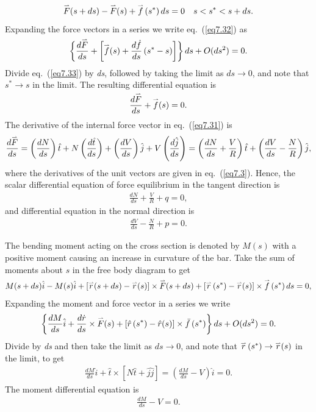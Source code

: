 \documentclass{AeroStructure-ERJohnson}
\def\harp#1{\smash{\mathord{\buildrel{\lower3pt\hbox{$\scriptscriptstyle\rightharpoonup$}}\over{#1}}}}
\begin{document}
\begin{align}\label{eq7.32}
\harp{F}(s+d s)-\harp{F}(s)+\harp{f}\left(s^{*}\right) d s=0 \quad s<s^{*}<s+d s.
\end{align}
Expanding the force vectors in a series we write eq.~(\ref{eq7.32}) as
\begin{align}\label{eq7.33}
\left\{\frac{d \harp{F}}{d s}+\left[\harp{f}(s)+\frac{d \dot{f}}{d s}\left(s^{*}-s\right)\right]\right\} d s+O(d s^{2})=0.
\end{align}
Divide eq.~(\ref{eq7.33}) by \textit{ds}, followed by taking the limit as $d s \rightarrow 0$, and note that $s^{*} \rightarrow s$ in the limit. The resulting differential equation is
\begin{align}\label{eq7.34}
\frac{d \harp{F}}{d s}+\harp{f}(s)=0.
\end{align}
The derivative of the internal force vector in eq.~(\ref{eq7.31}) is
\begin{equation*}
\frac{d \harp{F}}{d s}=\left(\frac{d N}{d s}\right) \hat{t}+N\left(\frac{d \hat{t}}{d s}\right)+\left(\frac{d V}{d s}\right) \hat{j}+V\left(\frac{d \hat{j}}{d s}\right)=\left(\frac{d N}{d s}+\frac{V}{R}\right) \hat{t}+\left(\frac{d V}{d s}-\frac{N}{R}\right) \hat{j},
\end{equation*}
where the derivatives of the unit vectors are given in eq.~(\ref{eq7.3}). Hence, the scalar differential equation of force equilibrium in the tangent direction is
\begin{align}\label{eq7.35}
\frac{d N}{d s}+\frac{V}{R}+q=0,
\end{align}
and differential equation in the normal direction is
\begin{align}\label{eq7.36}
\frac{d V}{d s}-\frac{N}{R}+p=0.
\end{align}

The bending moment acting on the cross section is denoted by $M(s)$ with a positive moment causing an increase in curvature of the bar. Take the sum of moments about $s$ in the free body diagram to get
\begin{align}\label{eq7.37}
M(s+d s) \hat{i}-M(s) \hat{i}+[\harp{r}(s+d s)-\harp{r}(s)] \times \harp{F}(s+d s)+\left[\harp{r}\left(s^{*}\right)-\harp{r}(s)\right] \times \harp{f}\left(s^{*}\right) d s=0,
\end{align}
Expanding the moment and force vector in a series we write
\begin{align}\label{eq7.38}
\left\{\frac{d M}{d s} \hat{i}+\frac{d \dot{r}}{d s} \times \harp{F}(s)+\left[\hat{r}\left(s^{*}\right)-\hat{r}(s)\right] \times \bar{f}\left(s^{*}\right)\right\} d s+O(d s^{2})=0.
\end{align}
Divide by \textit{ds} and then take the limit as $d s \rightarrow 0$, and note that $\harp{r}\left(s^{*}\right) \rightarrow \harp{r}(s)$ in the limit, to get
\begin{align}\label{eq7.39}
\frac{d M}{d s} \hat{i}+\hat{t} \times[N \hat{t}+\hat{j j}]=\left(\frac{d M}{d s}-V\right) \hat{i}=0.
\end{align}
The moment differential equation is
\begin{align}\label{eq7.40}
\frac{d M}{d s}-V=0.
\end{align}
\end{document}
